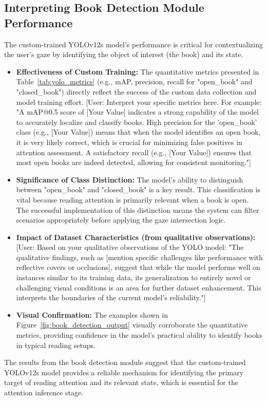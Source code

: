 \subsection{Interpreting Book Detection Module Performance}
The custom-trained YOLOv12s model's performance is critical for contextualizing the user's gaze by identifying the object of interest (the book) and its state.
\begin{itemize}
    \item \textbf{Effectiveness of Custom Training:} The quantitative metrics presented in Table~\ref{tab:yolo_metrics} (e.g., mAP, precision, recall for "open\_book" and "closed\_book") directly reflect the success of the custom data collection and model training effort. [User: Interpret your specific metrics here. For example: "A mAP@0.5 score of [Your Value] indicates a strong capability of the model to accurately localize and classify books. High precision for the 'open\_book' class (e.g., [Your Value]) means that when the model identifies an open book, it is very likely correct, which is crucial for minimizing false positives in attention assessment. A satisfactory recall (e.g., [Your Value]) ensures that most open books are indeed detected, allowing for consistent monitoring."]
    
    \item \textbf{Significance of Class Distinction:} The model's ability to distinguish between "open\_book" and "closed\_book" is a key result. This classification is vital because reading attention is primarily relevant when a book is open. The successful implementation of this distinction means the system can filter scenarios appropriately before applying the gaze intersection logic.
    
    \item \textbf{Impact of Dataset Characteristics (from qualitative observations):} [User: Based on your qualitative observations of the YOLO model: "The qualitative findings, such as [mention specific challenges like performance with reflective covers or occlusions], suggest that while the model performs well on instances similar to its training data, its generalization to entirely novel or challenging visual conditions is an area for further dataset enhancement. This interprets the boundaries of the current model's reliability."]
    
    \item \textbf{Visual Confirmation:} The examples shown in Figure~\ref{fig:book_detection_output} visually corroborate the quantitative metrics, providing confidence in the model's practical ability to identify books in typical reading setups.
\end{itemize}
The results from the book detection module suggest that the custom-trained YOLOv12s model provides a reliable mechanism for identifying the primary target of reading attention and its relevant state, which is essential for the attention inference stage.

